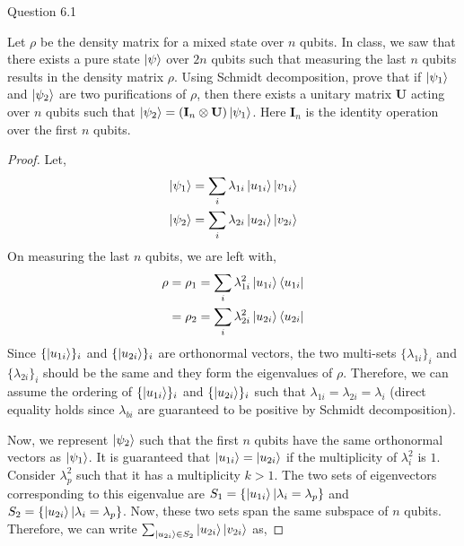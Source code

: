 \begin{solution}{Question 6.1}\label{ques:61}
    \begin{question}
        Let $\rho$ be the density matrix for a mixed state over $n$ qubits. In class, we saw that there exists a pure state $\ket{\psi}$ over $2n$ qubits such that measuring the last $n$ qubits results in the density matrix $\rho$. Using Schmidt decomposition, prove that if $\ket{\psi_1}$ and $\ket{\psi_2}$ are two purifications of $\rho$, then there exists a unitary matrix $\mathbf{U}$ acting over $n$ qubits such that $\ket{\psi_2} = (\mathbf{I}_n \otimes \mathbf{U}) \ket{\psi_1}$. Here $\mathbf{I}_n$ is the identity operation over the first $n$ qubits.
    \end{question}
    \tcblower{}
    \begin{proof}
        Let,
        \begin{equation}
            \begin{split}
                \ket{\psi_1} &= \sum_i\lambda_{1i}\ket{u_{1i}}\ket{v_{1i}}\\
                \ket{\psi_2} &= \sum_i\lambda_{2i}\ket{u_{2i}}\ket{v_{2i}}
            \end{split}
        \end{equation}
        On measuring the last $n$ qubits, we are left with,
        \begin{equation}
            \begin{split}
                \rho = \rho_1 &= \sum_i\lambda_{1i}^2\ket{u_{1i}}\bra{u_{1i}}\\
                =\rho_2 &= \sum_i\lambda_{2i}^2\ket{u_{2i}}\bra{u_{2i}}
            \end{split}
        \end{equation}
        Since $\{\ket{u_{1i}}\}_i$ and $\{\ket{u_{2i}}\}_i$ are orthonormal vectors, the two multi-sets $\{\lambda_{1i}\}_i$ and $\{\lambda_{2i}\}_i$ should be the same and they form the eigenvalues of $\rho$. Therefore, we can assume the ordering of $\{\ket{u_{1i}}\}_i$ and $\{\ket{u_{2i}}\}_i$ such that $\lambda_{1i} = \lambda_{2i} = \lambda_i$ (direct equality holds since $\lambda_{bi}$ are guaranteed to be positive by Schmidt decomposition).\par
        Now, we represent $\ket{\psi_2}$ such that the first $n$ qubits have the same orthonormal vectors as $\ket{\psi_1}$. It is guaranteed that $\ket{u_{1i}} = \ket{u_{2i}}$ if the multiplicity of $\lambda_i^2$ is $1$. Consider $\lambda_p^2$ such that it has a multiplicity $k > 1$. The two sets of eigenvectors corresponding to this eigenvalue are $S_1 = \{\ket{u_{1i}} | \lambda_i = \lambda_p\}$ and $S_2 = \{\ket{u_{2i}} | \lambda_i = \lambda_p\}$. Now, these two sets span the same subspace of $n$ qubits. Therefore, we can write $\sum_{\ket{u_{2i}}\in S_2}\ket{u_{2i}}\ket{v_{2i}}$ as,

\end{proof}
\end{solution}
